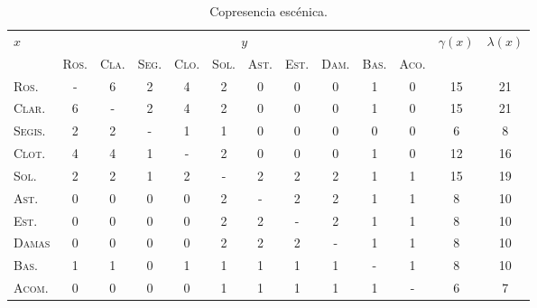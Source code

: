 \begin{table}[ht!]
	\centering\footnotesize
	\begin{tabular}{lcccccccccccc}
		\toprule
		$x$&\multicolumn{10}{c}{$y$}&$\gamma(x)$&$\lambda(x)$\\\cline{2-11}
		&\textsc{Ros.} & \textsc{Cla.}& \textsc{Seg.}& \textsc{Clo.}& \textsc{Sol.}& \textsc{Ast.}& \textsc{Est.}& \textsc{Dam.}& \textsc{Bas.}&  \textsc{Aco.}&& \\
		\midrule
		\textsc{Ros.}	& - & 6 & 2 & 4 & 2 & 0 & 0 & 0 & 1 & 0 & 15&21 \\
		\textsc{Clar.}	& 6 & - & 2 & 4 & 2 & 0 & 0 & 0 & 1 & 0 & 15&21 \\
		\textsc{Segis.}	& 2 & 2 & - & 1 & 1 & 0 & 0 & 0 & 0 & 0 & 6&8 \\
		\textsc{Clot.}	& 4 & 4 & 1 & - & 2 & 0 & 0 & 0 & 1 & 0 & 12&16 \\
		\textsc{Sol.}	& 2 & 2 & 1 & 2 & - & 2 & 2 & 2 & 1 & 1 & 15&19 \\
		\textsc{Ast.}	& 0 & 0 & 0 & 0 & 2 & - & 2 & 2 & 1 & 1 & 8&10\\
		\textsc{Est.}	& 0 & 0 & 0 & 0 & 2 & 2 & - & 2 & 1 & 1 & 8&10\\
		\textsc{Damas}	& 0 & 0 & 0 & 0 & 2 & 2 & 2 & - & 1 & 1 & 8&10\\
		\textsc{Bas.}	& 1 & 1 & 0 & 1 & 1 & 1 & 1 & 1 & - & 1 & 8&10\\
		\textsc{Acom.}	& 0 & 0 & 0 & 0 & 1 & 1 & 1 & 1 & 1 & - & 6&7\\
		\bottomrule
	\end{tabular}
	\caption{Copresencia escénica.}
	\label{tab:gamma}
\end{table}
